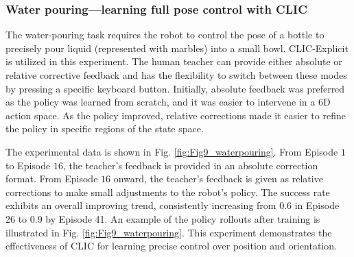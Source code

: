 \subsubsection{Water pouring—learning full pose control with CLIC}
The water-pouring task requires the robot to control the pose of a bottle to precisely pour liquid (represented with marbles) into a small bowl. 
CLIC-Explicit is utilized in this experiment. 
The human teacher can provide either absolute or relative corrective feedback and has the flexibility to switch between these modes by pressing a specific keyboard button. 
Initially, absolute feedback was preferred as the policy was learned from scratch, and it was easier to intervene in a 6D action space. As the policy improved, relative corrections made it easier to refine the policy in specific regions of the state space.

The experimental data is shown in Fig. \ref{fig:Fig9_waterpouring}. From Episode $1$ to Episode $16$, the teacher's feedback is provided in an absolute correction format. From Episode $16$ onward, the teacher's feedback is given as relative corrections to make small adjustments to the robot's policy. The success rate exhibits an overall improving trend, consistently increasing from 0.6 in Episode 26 to 0.9 by Episode 41. An example of the policy rollouts after training is illustrated in Fig. \ref{fig:Fig9_waterpouring}.
This experiment demonstrates the effectiveness of CLIC for learning precise control over position and orientation.















 




